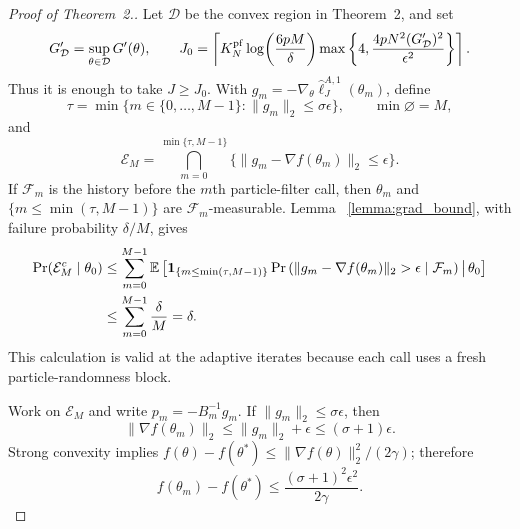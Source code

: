 \documentclass[11pt]{article}
\newcommand\thmMopConvergence{2}
\theoremstyle{thmstylethree}%
\begin{document}
\begin{proof}[Proof of Theorem~{\thmMopConvergence}.]
Let $\mathcal D$ be the convex region in Theorem~{\thmMopConvergence}, and set
\begin{equation}
G'_{\mathcal D}=\sup_{\theta\in\mathcal D}G'(\theta),\qquad
J_0=\left\lceil
K_N^{\rm pf}\log\!\left(\frac{6pM}{\delta}\right)
\max\left\{4,
\frac{4pN^2(G'_{\mathcal D})^2}{\epsilon^2}
\right\}\right\rceil.                                      \label{eq:s2-theorem-particle-count}
\end{equation}
Thus it is enough to take $J\geq J_0$.  With
$g_m=-\nabla_\theta\hat\ell_J^{A,1}(\theta_m)$, define
\begin{equation}
\tau=\min\big\{m\in\{0,\ldots,M-1\}:\|g_m\|_2\leq\sigma\epsilon\big\},
\qquad \min\varnothing=M,                                  \label{eq:s2-stopping-time}
\end{equation}
and
\begin{equation}
\mathcal E_M=
\bigcap_{m=0}^{\min\{\tau,M-1\}}
\big\{\|g_m-\nabla f(\theta_m)\|_2\leq\epsilon\big\}.    \label{eq:s2-gradient-event}
\end{equation}
If $\mathcal F_m$ is the history before the $m$th particle-filter call, then
$\theta_m$ and
$\{m\leq\min(\tau,M-1)\}$ are $\mathcal F_m$-measurable.  Lemma~
\ref{lemma:grad_bound}, with failure probability $\delta/M$, gives
\begin{equation}
\begin{aligned}
\Pr(\mathcal E_M^c\mid\theta_0)
&\leq\sum_{m=0}^{M-1}
 \mathbb{E}\left[\mathbf1_{\{m\leq\min(\tau,M-1)\}}
 \Pr\left(
 \|g_m-\nabla f(\theta_m)\|_2>\epsilon\mid\mathcal F_m
 \right)\,\middle|\,\theta_0\right]\\
&\leq\sum_{m=0}^{M-1}\frac{\delta}{M}=\delta.
\end{aligned}                                                   \label{eq:s2-all-gradient-events}
\end{equation}
This calculation is valid at the adaptive iterates because each call uses a
fresh particle-randomness block.

Work on $\mathcal E_M$ and write
$p_m=-B_m^{-1}g_m$.  If $\|g_m\|_2\leq\sigma\epsilon$, then
\begin{equation}
\|\nabla f(\theta_m)\|_2
 \leq\|g_m\|_2+\epsilon\leq(\sigma+1)\epsilon.                 \label{eq:s2-stopping-gradient}
\end{equation}
Strong convexity implies
$f(\theta)-f(\theta^*)\leq\|\nabla f(\theta)\|_2^2/(2\gamma)$;
therefore
\begin{equation}
f(\theta_m)-f(\theta^*)
\leq\frac{(\sigma+1)^2\epsilon^2}{2\gamma}.                   \label{eq:s2-stopping-neighborhood}
\end{equation}


\end{proof}
\end{document}

